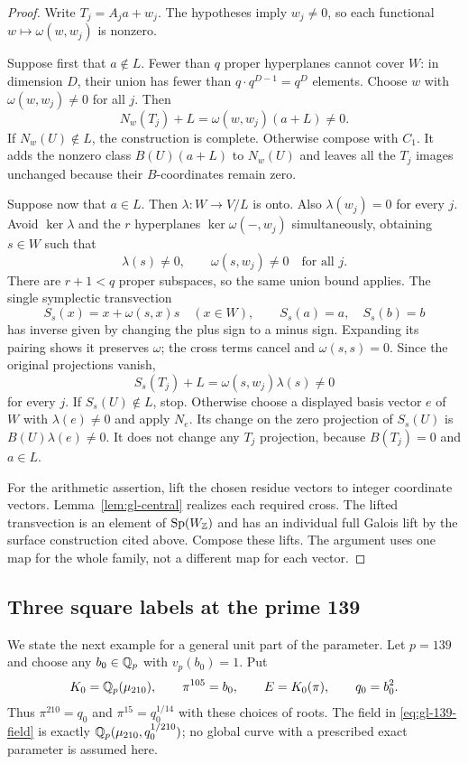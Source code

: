 \begin{proof}
Write $T_j=A_ja+w_j$. The hypotheses imply $w_j\ne0$, so each
functional $w\mapsto\omega(w,w_j)$ is nonzero.

Suppose first that $a\notin L$. Fewer than $q$ proper hyperplanes
cannot cover $W$: in dimension $D$, their union has fewer than
$q\cdot q^{D-1}=q^D$ elements. Choose $w$ with
$\omega(w,w_j)\ne0$ for all $j$. Then
\[
 N_w(T_j)+L=\omega(w,w_j)(a+L)\ne0.
\]
If $N_w(U)\notin L$, the construction is complete. Otherwise
compose with $C_1$. It adds the nonzero class $B(U)(a+L)$ to
$N_w(U)$ and leaves all the $T_j$ images unchanged because their
$B$-coordinates remain zero.

Suppose now that $a\in L$. Then $\lambda:W\to V/L$ is onto.
Also $\lambda(w_j)=0$ for every $j$. Avoid $\ker\lambda$ and
the $r$ hyperplanes $\ker\omega(-,w_j)$ simultaneously, obtaining
$s\in W$ such that
\[
 \lambda(s)\ne0,\qquad\omega(s,w_j)\ne0\quad\text{for all }j.
\]
There are $r+1<q$ proper subspaces, so the same union bound applies.
The single symplectic transvection
\[
 S_s(x)=x+\omega(s,x)s\quad(x\in W),\qquad
 S_s(a)=a,\quad S_s(b)=b
\]
has inverse given by changing the plus sign to a minus sign.
Expanding its pairing shows it preserves $\omega$; the cross
terms cancel and $\omega(s,s)=0$. Since the original projections
vanish,
\[
 S_s(T_j)+L=\omega(s,w_j)\lambda(s)\ne0
\]
for every $j$. If $S_s(U)\notin L$, stop. Otherwise choose a
displayed basis vector $e$ of $W$ with $\lambda(e)\ne0$ and
apply $N_e$. Its change on the zero projection of $S_s(U)$ is
$B(U)\lambda(e)\ne0$. It does not change any $T_j$ projection,
because $B(T_j)=0$ and $a\in L$.

For the arithmetic assertion, lift the chosen residue vectors to
integer coordinate vectors. Lemma~\ref{lem:gl-central} realizes
each required cross. The lifted transvection is an element of
$\operatorname{Sp}(W_\mathbb Z)$ and has an individual full Galois lift
by the surface construction cited above. Compose these lifts.
The argument uses one map for the whole family, not a different
map for each vector.
\end{proof}

\subsection{Three square labels at the prime 139}

We state the next example for a general unit part of the parameter.
Let $p=139$ and choose any $b_0\in\mathbb Q_p$ with $v_p(b_0)=1$. Put
\begin{equation}\label{eq:gl-139-field}
 K_0=\mathbb Q_p(\mu_{210}),\qquad \pi^{105}=b_0,
 \qquad E=K_0(\pi),\qquad q_0=b_0^2.
\end{equation}
Thus $\pi^{210}=q_0$ and $\pi^{15}=q_0^{1/14}$ with these choices
of roots. The field in \eqref{eq:gl-139-field} is exactly
$\mathbb Q_p(\mu_{210},q_0^{1/210})$; no global curve with a prescribed
exact parameter is assumed here.

